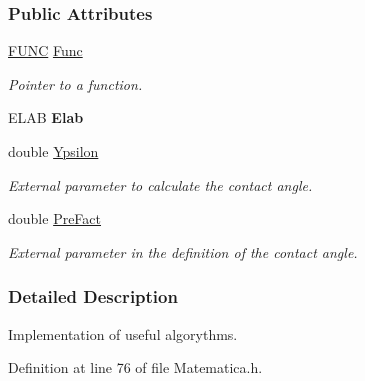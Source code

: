 \subsubsection*{Public Attributes}
\begin{DoxyCompactItemize}
\item 
\hyperlink{classMatematica_a25c3f9afc44add814e929b99b6b54cfe}{F\+U\+NC} \hyperlink{classMatematica_aba8f98cb34b78863b26b00d33aabdc1d}{Func}\hypertarget{classMatematica_aba8f98cb34b78863b26b00d33aabdc1d}{}\label{classMatematica_aba8f98cb34b78863b26b00d33aabdc1d}

\begin{DoxyCompactList}\small\item\em Pointer to a function. \end{DoxyCompactList}\item 
E\+L\+AB {\bfseries Elab}\hypertarget{classMatematica_ab450221750ec28195ca862278004e64f}{}\label{classMatematica_ab450221750ec28195ca862278004e64f}

\item 
double \hyperlink{classMatematica_aa06af2f751c2d30f883911088239686e}{Ypsilon}\hypertarget{classMatematica_aa06af2f751c2d30f883911088239686e}{}\label{classMatematica_aa06af2f751c2d30f883911088239686e}

\begin{DoxyCompactList}\small\item\em External parameter to calculate the contact angle. \end{DoxyCompactList}\item 
double \hyperlink{classMatematica_a4eff9d128336501e44aac2b9524eb6b0}{Pre\+Fact}\hypertarget{classMatematica_a4eff9d128336501e44aac2b9524eb6b0}{}\label{classMatematica_a4eff9d128336501e44aac2b9524eb6b0}

\begin{DoxyCompactList}\small\item\em External parameter in the definition of the contact angle. \end{DoxyCompactList}\end{DoxyCompactItemize}


\subsubsection{Detailed Description}
Implementation of useful algorythms. 

Definition at line 76 of file Matematica.\+h.



